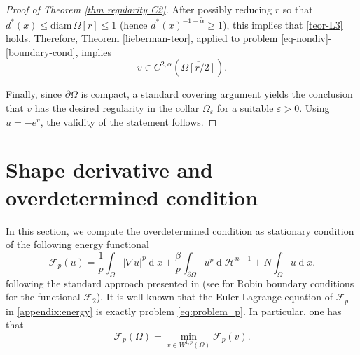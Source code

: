 \documentclass[10pt,a4paper]{amsart}
\numberwithin{equation}{section}
\renewcommand{\d}[1]{\ensuremath{\operatorname{d}\!{#1}}}
\begin{document}
\begin{proof}[Proof of Theorem \ref{thm regularity C2}]
After possibly reducing $r$ so that $d^\ast(x) \le \mathrm{diam}\,\Omega[r] \le 1$ (hence $d^\ast(x)^{-1-\tilde{\alpha}} \ge 1$), this implies  that \eqref{teor-L3} holds. Therefore, Theorem \ref{lieberman-teor}, applied to problem \eqref{eq-nondiv}-\eqref{boundary-cond}, implies
\[
    v\in C^{2,\tilde{\alpha}}(\overline{\Omega[r/2]}).
\]

Finally, since $\partial\Omega$ is compact, a standard covering argument yields the conclusion that $v$ has the desired regularity in the collar $\Omega_\varepsilon$ for a suitable $\varepsilon>0$. Using $u=-e^v$, the validity of the statement follows. 
\end{proof}

\section{Shape derivative and overdetermined condition}\label{sec: appendix shape}
In this section, we compute the overdetermined condition as stationary condition of the following energy functional 
\begin{equation}\label{appendix:energy}
    \mathcal{F}_p(u)=\frac{1}{p}\int_\Omega|\nabla u|^p\d{x}+\frac{\beta}{p}\int_{\partial\Omega}u^p\d{}\mathcal{H}^{n-1}+N\int_\Omega u\d{x}.
\end{equation}
following the standard approach presented in \cite{hepi18} (see \cite{bw} for Robin boundary conditions for the functional $\mathcal{F}_2$).
It is well known that the Euler-Lagrange equation of $\mathcal{F}_p$ in \eqref{appendix:energy} is exactly problem \eqref{eq:problem_p}. In particular, one has that 
\begin{equation*}
    \mathcal{F}_p(\Omega) = \min_{v \in W^{1,p}(\Omega)} \mathcal{F}_p(v).
\end{equation*}
\end{document}
